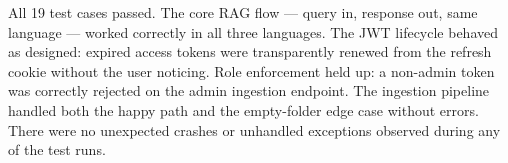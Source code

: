 All 19 test cases passed. The core RAG flow --- query in, response out, same language ---
worked correctly in all three languages. The JWT lifecycle behaved as designed: expired
access tokens were transparently renewed from the refresh cookie without the user
noticing. Role enforcement held up: a non-admin token was correctly rejected on the
admin ingestion endpoint. The ingestion pipeline handled both the happy path and the
empty-folder edge case without errors. There were no unexpected crashes or unhandled
exceptions observed during any of the test runs.
